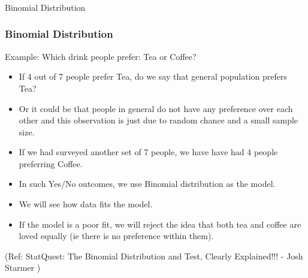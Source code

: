 \begin{frame}[fragile]\frametitle{}
\begin{center}
{\Large Binomial Distribution}
\end{center}
\end{frame}

\begin{frame}[fragile]\frametitle{Binomial Distribution}
Example: Which drink people prefer: Tea or Coffee?


	\begin{itemize}
	\item If 4 out of 7 people prefer Tea, do we say that general population prefers Tea?
	\item Or it could be that people in general do not have any preference over each other and this observation is just due to random chance and a small sample size.
	\item If we had surveyed another set of 7 people, we have have had 4 people preferring Coffee.
	\item In such Yes/No outcomes, we use Binomial distribution as the model.
	\item We will see how data fits the model.
	\item If the model is a poor fit, we will reject the idea that both tea and coffee are loved equally (ie there is no preference within them).
	\end{itemize}



  
\tiny{(Ref: StatQuest: The Binomial Distribution and Test, Clearly Explained!!! - Josh Starmer )}
\end{frame}

